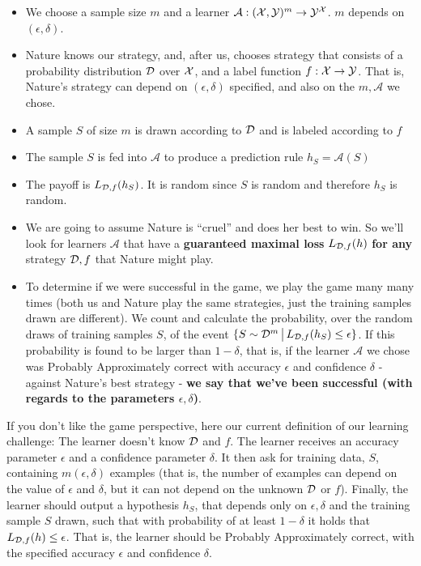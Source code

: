 \documentclass[11pt]{article}
\newcommand{\Ac}{\mathcal{A}}
\begin{document}
  \begin{itemize}
    \item We choose a sample size $m$ and a learner $\Ac:(\X,\Y)^m \to \Y^\X$. 
    $m$ depends on $(\epsilon,\delta)$.
       \item Nature knows our strategy, and, after us, chooses strategy that consists of a probability distribution $\mathcal{D}$ over $\mathcal{X}$, and a label function $f:\mathcal{X}\to\mathcal{Y}$. 
       That is, Nature's strategy can depend on $(\epsilon,\delta)$ specified, and also on the $m,\Ac$ we chose. 
    \item A sample $S$ of size $m$ is drawn according to $\mathcal{D}$ and is labeled
      according to $f$
    \item The sample $S$ is fed into $\Ac$ to produce a prediction rule
      $h_S=\Ac(S)$
    \item The payoff is $L_{\mathcal{D},f}(h_S)$. It is random since $S$ is random and
      therefore $h_S$ is random.
    \item We are going to assume Nature is ``cruel'' and does her best to win.
      So we'll look for learners $\Ac$ that have a {\bf guaranteed maximal 
      loss} $L_{\mathcal{D},f}(h)$ {\bf for any} strategy $\mathcal{D},f$ that Nature might play.
      \item To determine if we were successful in the game, we play the game many many times 
      (both us and Nature play the same strategies, just the training samples drawn are different).
      We count and calculate the probability, over the random draws of training samples $S$, of the event
      $\{ S \sim \mathcal{D}^m \,\big |\,L_{\mathcal{D},f}(h_S)\leq \epsilon \}$. If this probability is found to be 
      larger than $1-\delta$, that is, if 
      the learner $\Ac$ we chose was Probably Approximately correct with accuracy $\epsilon$ and confidence $\delta$ - against Nature's best strategy - {\bf we say that we've been successful (with regards to the parameters $\epsilon,\delta$)}.
\end{itemize}


If you don't like the game perspective, here our current definition of our learning challenge:
The learner doesn't know $\mathcal{D}$ and $f$. The learner receives an accuracy parameter $\epsilon$ and a confidence parameter $\delta$. It then ask for training data, $S$, containing $m(\epsilon,\delta)$ examples (that is, the number of examples can depend on the value of $\epsilon$ and $\delta$, but it can not depend on the unknown $\mathcal{D}$ or $f$). Finally, the learner should output a hypothesis $h_S$, that depends only on $\epsilon, \delta$ and the training sample $S$ drawn, such that with probability of at least $1-\delta$  it holds that $L_{\mathcal{D},f}(h) \le \epsilon$. That is, the learner should be Probably Approximately correct, with the specified accuracy $\epsilon$ and confidence $\delta$.
\end{document}
